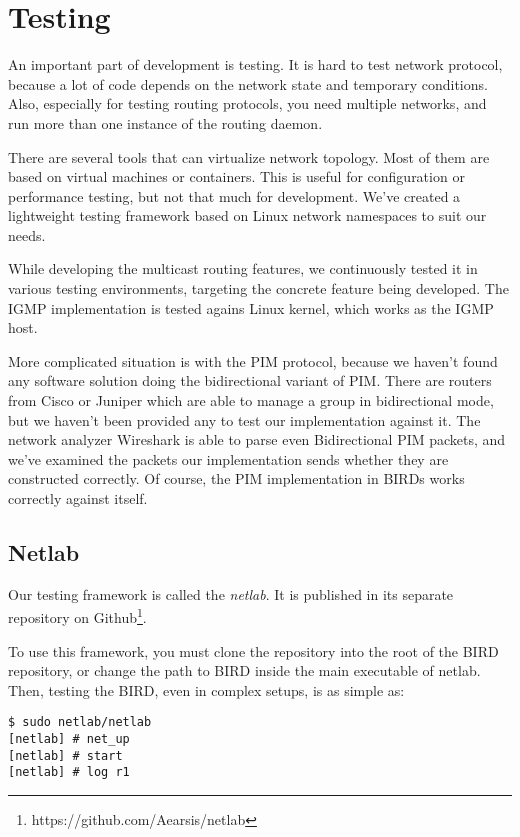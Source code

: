 \chapter{Testing}

An important part of development is testing. It is hard to test network
protocol, because a lot of code depends on the network state and temporary
conditions. Also, especially for testing routing protocols, you need multiple
networks, and run more than one instance of the routing daemon.

There are several tools that can virtualize network topology. Most of them are
based on virtual machines or containers. This is useful for configuration or
performance testing, but not that much for development. We've created
a lightweight testing framework based on Linux network namespaces to suit our
needs.

While developing the multicast routing features, we continuously tested it in
various testing environments, targeting the concrete feature being developed.
The IGMP implementation is tested agains Linux kernel, which works as the IGMP
host.

More complicated situation is with the PIM protocol, because we haven't
found any software solution doing the bidirectional variant of PIM. There are
routers from Cisco or Juniper which are able to manage a group in bidirectional
mode, but we haven't been provided any to test our implementation against it.
The network analyzer Wireshark is able to parse even Bidirectional PIM packets,
and we've examined the packets our implementation sends whether they are
constructed correctly. Of course, the PIM implementation in BIRDs works
correctly against itself.

\section{Netlab}
Our testing framework is called the \emph{netlab}. It is published in its
separate repository on Github\footnote{https://github.com/Aearsis/netlab}.

To use this framework, you must clone the repository into the root of the BIRD
repository, or change the path to BIRD inside the main executable of netlab.
Then, testing the BIRD, even in complex setups, is as simple as:

\begin{lstlisting}
$ sudo netlab/netlab
[netlab] # net_up
[netlab] # start
[netlab] # log r1
\end{lstlisting}

